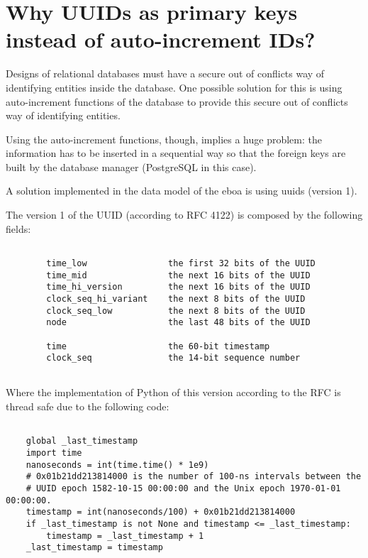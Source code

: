 \chapter{Why UUIDs as primary keys instead of auto-increment IDs?}

Designs of relational databases must have a secure out of conflicts way of identifying entities inside the database. One possible solution for this is using auto-increment functions of the database to provide this secure out of conflicts way of identifying entities.

Using the auto-increment functions, though, implies a huge problem: the information has to be inserted in a sequential way so that the foreign keys are built by the database manager (PostgreSQL in this case).

A solution implemented in the data model of the \acrshort{eboa} is using \acrshort{uuid}s (version 1).

The version 1 of the UUID (according to RFC 4122) is composed by the following fields: 

\begin{lstlisting}[style=bash, caption={XML input example for showing the values structure management.}]

        time_low                the first 32 bits of the UUID
        time_mid                the next 16 bits of the UUID
        time_hi_version         the next 16 bits of the UUID
        clock_seq_hi_variant    the next 8 bits of the UUID
        clock_seq_low           the next 8 bits of the UUID
        node                    the last 48 bits of the UUID

        time                    the 60-bit timestamp
        clock_seq               the 14-bit sequence number
        
\end{lstlisting}

Where the implementation of Python of this version according to the RFC is thread safe due to the following code:

\begin{lstlisting}[style=python, caption={Python code showing how the algorithm provides a mechanism for using UUIDs in a thread safe manner.}]

    global _last_timestamp
    import time
    nanoseconds = int(time.time() * 1e9)
    # 0x01b21dd213814000 is the number of 100-ns intervals between the
    # UUID epoch 1582-10-15 00:00:00 and the Unix epoch 1970-01-01 00:00:00.
    timestamp = int(nanoseconds/100) + 0x01b21dd213814000
    if _last_timestamp is not None and timestamp <= _last_timestamp:
        timestamp = _last_timestamp + 1
    _last_timestamp = timestamp
    
\end{lstlisting}

